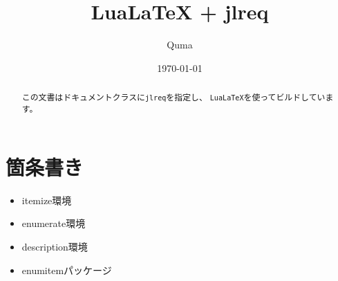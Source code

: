 \documentclass{jlreq}
\title{LuaLaTeX + jlreq}
\author{Quma}
\date{\today}
\begin{document}
\maketitle

\begin{abstract}
この文書はドキュメントクラスに\texttt{jlreq}を指定し、
\texttt{LuaLaTeX}を使ってビルドしています。
\end{abstract}

\tableofcontents




\section{箇条書き}

\begin{itemize}
    \item itemize環境
    \item enumerate環境
    \item description環境
    \item enumitemパッケージ
\end{itemize}














\end{document}
